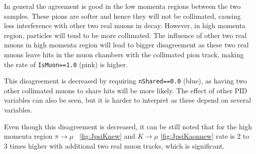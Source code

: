 In general the agreement is good in the low momenta regions between the two samples. These pions are softer and hence they will not be collimated, causing less interference with other two real muons in decay. However, in high momenta region, particles will tend to be more collimated. The influence of other two real muons in high momenta region will lead to bigger disagreement as these two real muons leave hits in the muon chambers with the collimated pion track, making the rate of \texttt{IsMuon==1.0} (pink) is higher. 

This disagreement is decreased by requiring \texttt{nShared==0.0} (blue), as having two other collimated muons to share hits will be more likely. The effect of other \gls{PID} variables can also be seen, but it is harder to interpret as these depend on several variables.

Even though this disagreement is decreased, it can be still noted that for the high momenta region $\pi \rightarrow \mu$ ~\autoref{fig:JpsiKnew} and $K \rightarrow \mu$ \autoref{fig:JpsiKaonnew} rate is 2 to 3 times higher with additional two real muon tracks, which is significant. 



